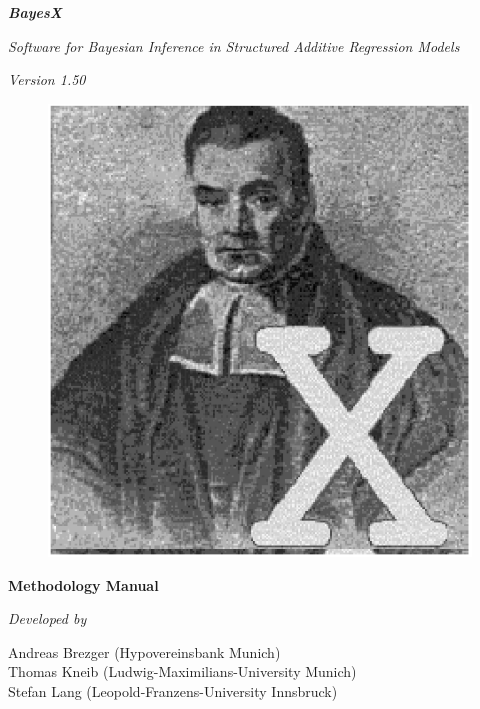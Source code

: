 \documentclass[11pt,a4paper,twoside]{bayesxarticle}
\begin{document}
\MakeShortVerb{\#}

\thispagestyle{empty}

\begin{center}
{\bf \em \huge BayesX}

\vspace{0.5cm}

 {\em \large Software for Bayesian Inference in Structured Additive Regression Models}

\vspace{0.5cm}

 {\em Version 1.50}

\vspace{0.5cm}

\begin{figure}[h]
\begin{center}
\includegraphics[scale=1.2]{grafiken/bayesicon.eps}
\end{center}
\end{figure}

\vfill

{\bf\sffamily \huge Methodology Manual}

\vfill

\end{center}

{\em Developed by}

Andreas Brezger (Hypovereinsbank Munich)\\
Thomas Kneib (Ludwig-Maximilians-University Munich)\\
Stefan Lang (Leopold-Franzens-University Innsbruck)\\
\end{document}
